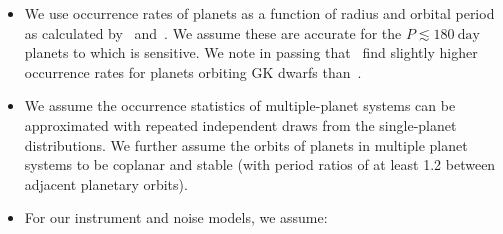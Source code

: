 \begin{itemize}
	\item We use occurrence rates of planets as a function of radius
          and orbital period as calculated by~\citet{fressin_false_2013}
          and~\citet{dressing_occurrence_2015}.
          We assume these are accurate for the 
          $P \lesssim 180\ \text{day}$ planets to which \tess is 
          sensitive. We note in passing that~\citet{burke_terrestrial_2015} 
          find slightly higher occurrence rates for planets orbiting GK dwarfs 
          than~\citet{fressin_false_2013}.
          
	\item We assume the occurrence statistics of multiple-planet systems 	
		  can be approximated with repeated independent draws from the 
		  single-planet distributions. We further assume the orbits of planets 
		  in multiple planet systems to be 
		  coplanar and stable (with period ratios of at least 1.2 between 
		  adjacent planetary orbits).
          
	\item For our instrument and noise models, we assume:
	  \begin{itemize}
            

\end{itemize}
\end{itemize}
